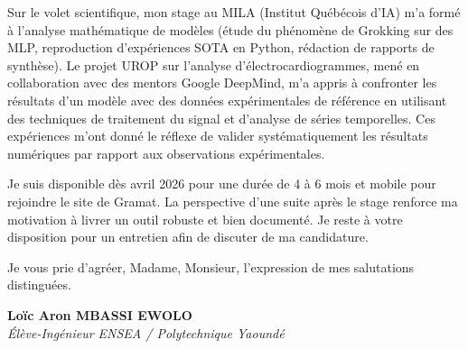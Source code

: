 \documentclass[a4paper,11pt]{article}
\begin{document}
Sur le volet scientifique, mon stage au MILA (Institut Québécois d'IA) m'a formé à l'analyse mathématique de modèles (étude du phénomène de Grokking sur des MLP, reproduction d'expériences SOTA en Python, rédaction de rapports de synthèse). Le projet UROP sur l'analyse d'électrocardiogrammes, mené en collaboration avec des mentors Google DeepMind, m'a appris à confronter les résultats d'un modèle avec des données expérimentales de référence en utilisant des techniques de traitement du signal et d'analyse de séries temporelles. Ces expériences m'ont donné le réflexe de valider systématiquement les résultats numériques par rapport aux observations expérimentales.

Je suis disponible dès avril 2026 pour une durée de 4 à 6 mois et mobile pour rejoindre le site de Gramat. La perspective d'une suite après le stage renforce ma motivation à livrer un outil robuste et bien documenté. Je reste à votre disposition pour un entretien afin de discuter de ma candidature.

Je vous prie d'agréer, Madame, Monsieur, l'expression de mes salutations distinguées.

\vspace{0.8cm}

\textbf{Loïc Aron MBASSI EWOLO}\\
\textit{Élève-Ingénieur ENSEA / Polytechnique Yaoundé}
\end{document}
